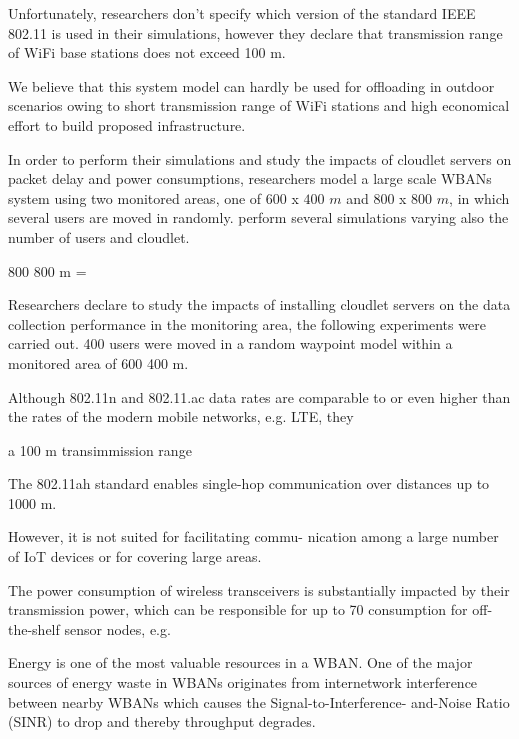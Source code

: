 \documentclass[sigchi]{acmart}
\begin{document}
Unfortunately, researchers don't specify which version of the standard IEEE 802.11 is used in their simulations, however they declare that transmission range of WiFi base stations does not exceed 100 m. 

We believe that this system model can hardly be used for offloading in outdoor scenarios owing to short transmission range of WiFi stations and high economical effort to build proposed infrastructure.



In order to perform their simulations and study the impacts of cloudlet servers on packet delay and power consumptions, researchers model a large scale WBANs system using two monitored areas, one of $600$ x $400$ $m$ and $800$ x $800$ $m$, in which several users are moved in randomly. \citet{MSAReport} perform several simulations varying also the number of users and cloudlet.





 800 800 m = 

Researchers declare to study the impacts of installing cloudlet servers on the data collection performance in the monitoring area, the
following experiments were carried out. 400 users were moved in a random waypoint model within a monitored area of
600 400 m.


Although 802.11n and 802.11.ac data rates are comparable to or
even higher than the rates of the modern mobile networks, e.g. LTE, they


a 100 m transimmission range







The 802.11ah standard enables single-hop communication over distances up to 1000 m.



However, it is not suited for facilitating commu-
nication among a large number of IoT devices or for covering
large areas.











The power consumption of wireless transceivers is 
substantially impacted by their transmission power, which 
can be responsible for up to 70%
consumption for off-the-shelf sensor nodes, e.g.

Energy is one of the most valuable resources in a 
WBAN. One of the major sources of energy waste in 
WBANs originates from internetwork interference between 
nearby WBANs which causes the Signal-to-Interference-
and-Noise Ratio (SINR) to drop and thereby throughput 
degrades.
\end{document}
